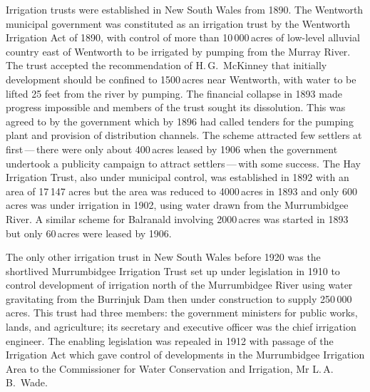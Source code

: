 Irrigation trusts were established in New South Wales from 1890.  The
Wentworth municipal government was constituted as an irrigation trust
by the Wentworth Irrigation Act  of 1890, with control of more than 10\,000\,acres of
low-level alluvial country east of Wentworth to be irrigated by
pumping from the Murray River.   The trust
accepted the recommendation of H.\,G.~McKinney that initially
development should be confined to 1500\,acres near Wentworth, with
water to be lifted 25 feet from the river by pumping.  The financial
collapse in 1893 made progress impossible and members of the trust
sought its dissolution.  This was agreed to by the government which by
1896 had called tenders for the pumping plant and provision of
distribution channels. The scheme attracted few settlers at
first\,---\,there were only about 400\,acres leased by 1906 when the
government undertook a publicity campaign to attract
settlers\,---\,with some success.  The Hay Irrigation Trust,
 also
under municipal control, was established in 1892 with an area of
17\,147 acres but the area was reduced to 4000\,acres in 1893 and only
600\,acres was under irrigation in 1902, using water drawn from the
Murrumbid\-gee River.   A similar scheme for
Balranald  involving 2000\,acres was started in
1893 but only 60\,acres were leased by 1906.

The only other irrigation trust in New South Wales before 1920 was the
shortlived Murrumbidgee Irrigation Trust
 set up under legislation in
1910 to control development of irrigation north of the Murrumbidgee
River  using water gravitating from the
Burrinjuk Dam
 then under construction to supply 250\,000\,acres.
This trust had three members: the government ministers for public
works, lands, and agriculture; its secretary and executive officer was
the chief irrigation engineer.  The enabling legislation was repealed
in 1912 with passage of the Irrigation Act
 which gave control of
developments in the Murrumbidgee Irrigation Area to the Commissioner
for Water Conservation and Irrigation, Mr
L.\,A.\,B.~Wade. 

